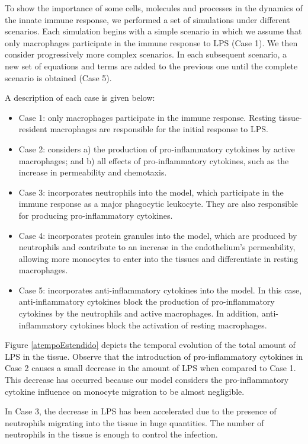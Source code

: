 \documentclass[10pt]{bmc_article}
\newenvironment{bmcformat}{\baselineskip20pt\sloppy\setboolean{publ}{false}}{\baselineskip20pt\sloppy}
\begin{document}
\begin{bmcformat}
To show the importance of some cells, molecules and processes in the dynamics of the innate immune response, 
we performed a set of simulations under different scenarios. Each simulation begins with a simple scenario in which we assume that 
only macrophages participate in the immune response to LPS (Case 1). We then consider progressively more complex scenarios. 
In each subsequent scenario, a new set of equations and terms are added to the previous one until the complete scenario is obtained 
(Case 5). 

A description of each case is given below: 
\begin{itemize}
\item Case 1: only macrophages participate in the immune response. Resting tissue-resident macrophages are responsible for the initial 
response to LPS. 
\item Case 2: considers a) the production of pro-inflammatory cytokines by active macrophages; and b) all effects of pro-inflammatory 
cytokines, such as the increase in permeability and chemotaxis. 
\item Case 3: incorporates neutrophils into the model, which participate in the immune response as a major phagocytic leukocyte. They 
are also responsible for producing pro-inflammatory cytokines. 
\item Case 4: incorporates protein granules into the model, which are produced by neutrophils and contribute to an increase in the 
endothelium's permeability, allowing more monocytes to enter into the tissues and differentiate in resting macrophages. 
\item Case 5: incorporates anti-inflammatory cytokines into the model. In this case, anti-inflammatory cytokines block the production 
of pro-inflammatory cytokines by the neutrophils and active macrophages. In addition, anti-inflammatory cytokines block the activation
of resting macrophages. 
\end{itemize}

Figure \ref{atempoEstendido} depicts the temporal evolution of the total amount of LPS in the tissue. 
Observe that the introduction of pro-inflammatory cytokines in Case 2 causes a small decrease in the amount of LPS when compared to Case 1. 
This decrease has occurred because our model considers the pro-inflammatory cytokine influence on monocyte migration to be almost 
negligible. 

In Case 3, the decrease in LPS has been accelerated due to the presence of neutrophils migrating into the tissue in huge quantities. 
The number of neutrophils in the tissue is enough to control the infection. 


\end{bmcformat}
\end{document}
